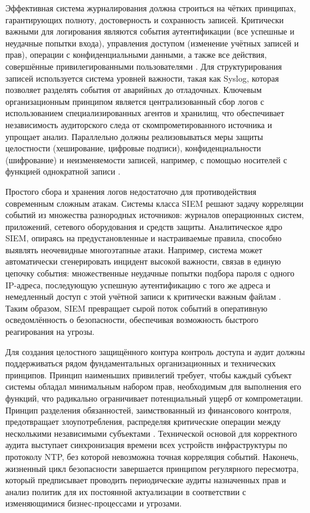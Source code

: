 \documentclass{SibFU-docs}
\begin{document}

Эффективная система журналирования должна строиться на чётких принципах, гарантирующих полноту, достоверность и сохранность записей. Критически важными для логирования являются события аутентификации (все успешные и неудачные попытки входа), управления доступом (изменение учётных записей и прав), операции с конфиденциальными данными, а также все действия, совершённые привилегированными пользователями \cite{Bejtlich2013}. Для структурирования записей используется система уровней важности, такая как Syslog, которая позволяет разделять события от аварийных до отладочных. Ключевым организационным принципом является централизованный сбор логов с использованием специализированных агентов и хранилищ, что обеспечивает независимость аудиторского следа от скомпрометированного источника и упрощает анализ. Параллельно должны реализовываться меры защиты целостности (хеширование, цифровые подписи), конфиденциальности (шифрование) и неизменяемости записей, например, с помощью носителей с функцией однократной записи \cite{Peltier2016}.


Простого сбора и хранения логов недостаточно для противодействия современным сложным атакам. Системы класса SIEM решают задачу корреляции событий из множества разнородных источников: журналов операционных систем, приложений, сетевого оборудования и средств защиты. Аналитическое ядро SIEM, опираясь на предустановленные и настраиваемые правила, способно выявлять неочевидные многоэтапные атаки. Например, система может автоматически сгенерировать инцидент высокой важности, связав в единую цепочку события: множественные неудачные попытки подбора пароля с одного IP-адреса, последующую успешную аутентификацию с того же адреса и немедленный доступ с этой учётной записи к критически важным файлам \cite{Bejtlich2013}. Таким образом, SIEM превращает сырой поток событий в оперативную осведомлённость о безопасности, обеспечивая возможность быстрого реагирования на угрозы.


Для создания целостного защищённого контура контроль доступа и аудит должны поддерживаться рядом фундаментальных организационных и технических принципов. Принцип наименьших привилегий требует, чтобы каждый субъект системы обладал минимальным набором прав, необходимым для выполнения его функций, что радикально ограничивает потенциальный ущерб от компрометации. Принцип разделения обязанностей, заимствованный из финансового контроля, предотвращает злоупотребления, распределяя критические операции между несколькими независимыми субъектами \cite{Peltier2016}. Технической основой для корректного аудита выступает синхронизация времени всех устройств инфраструктуры по протоколу NTP, без которой невозможна точная корреляция событий. Наконечь, жизненный цикл безопасности завершается принципом регулярного пересмотра, который предписывает проводить периодические аудиты назначенных прав и анализ политик для их постоянной актуализации в соответствии с изменяющимися бизнес-процессами и угрозами.
\end{document}
